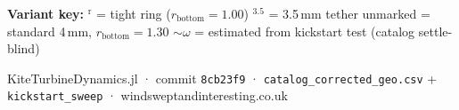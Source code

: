 \documentclass{article}
\begin{document}
\vspace{4pt}

{\footnotesize\color{textDim}
  \textbf{Variant key:} $^{\text{r}}$ = tight ring ($r_{\text{bottom}}{=}1.00$) \quad
  $^{3.5}$ = 3.5\,mm tether \quad
  unmarked = standard 4\,mm, $r_{\text{bottom}}{=}1.30$ \quad
  $\sim\omega$ = estimated from kickstart test (catalog settle-blind)
}

\vspace{6pt}

{\tiny\color{textDim} KiteTurbineDynamics.jl · commit \texttt{8cb23f9} · \texttt{catalog\_corrected\_geo.csv} + \texttt{kickstart\_sweep} · windsweptandinteresting.co.uk}
\end{document}
